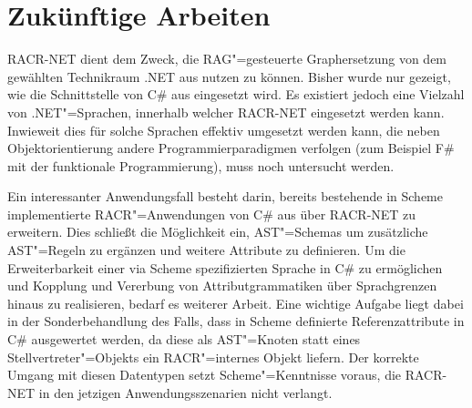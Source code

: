 \section{Zukünftige Arbeiten}

RACR-NET dient dem Zweck, die RAG"=gesteuerte Graphersetzung von dem gewählten Technikraum .NET aus nutzen zu können. Bisher wurde nur gezeigt, wie die Schnittstelle von C\# aus eingesetzt wird. Es existiert jedoch eine Vielzahl von .NET"=Sprachen, innerhalb welcher RACR-NET eingesetzt werden kann. Inwieweit dies für solche Sprachen effektiv umgesetzt werden kann, die neben Objektorientierung andere Programmierparadigmen verfolgen (zum Beispiel F\# mit der funktionale Programmierung), muss noch untersucht werden.

Ein interessanter Anwendungsfall besteht darin, bereits bestehende in Scheme implementierte RACR"=Anwendungen von C\# aus über RACR-NET zu erweitern. Dies schließt die Möglichkeit ein, AST"=Schemas um zusätzliche AST"=Regeln zu ergänzen und weitere Attribute zu definieren. Um die Erweiterbarkeit einer via Scheme spezifizierten Sprache in C\# zu ermöglichen und Kopplung und Vererbung von Attributgrammatiken über Sprachgrenzen hinaus zu realisieren, bedarf es weiterer Arbeit. Eine wichtige Aufgabe liegt dabei in der Sonderbehandlung des Falls, dass in Scheme definierte Referenzattribute in C\# ausgewertet werden, da diese als AST"=Knoten statt eines Stellvertreter"=Objekts ein RACR"=internes Objekt liefern. Der korrekte Umgang mit diesen Datentypen setzt Scheme"=Kenntnisse voraus, die RACR-NET in den jetzigen Anwendungsszenarien nicht verlangt.
